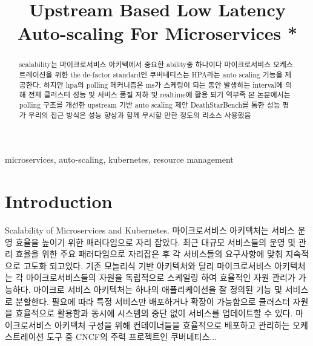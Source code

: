 \documentclass[conference]{IEEEtran}
\begin{document}
\title{Upstream Based Low Latency Auto-scaling For Microservices *\\}

\author{
}

\maketitle





\begin{abstract}

    scalability는 마이크로서비스 아키텍에서 중요한 ability중 하나이다
    마이크로서비스 오케스트레이션을 위한 the de-factor standard인 쿠버네티스는 HPA라는 auto scaling 기능을 제공한다. 하지만 hpa의 polling 메커니즘은 ms가 스케링이 되는 동안 발생하는 interval에 의해 전체 클러스터 성능 및 서비스 품질 저하 및 realtime에 활용 되기 역부족
    본 논문에서는 polling 구조를 개선한 upstream 기반 auto scaling 제안
    DeathStarBench를 통한 성능 평가
    우리의 접근 방식은 성능 향상과 함께 무시할 만한 정도의 리소스 사용했음

\end{abstract}




\begin{IEEEkeywords}
    microservices, auto-scaling, kubernetes, resource management
\end{IEEEkeywords}




\section{Introduction}
Scalability of Microservices and Kubernetes.
마이크로서비스 아키텍처는 서비스 운영 효율을 높이기 위한 패러다임으로 자리 잡았다. 최근 대규모 서비스들의 운영 및 관리 효율을 위한 주요 패러다임으로 자리잡은 후 각 서비스들의 요구사항에 맞춰 지속적으로 고도화 되고있다. 기존 모놀리식 기반 아키텍처와 달리 마이크로서비스 아키텍처는 각 마이크로서비스들의 자원을 독립적으로 스케일링 하여 효율적인 자원 관리가 가능하다. 마이크로 서비스 아키텍처는 하나의 애플리케이션을 잘 정의된 기능 및 서비스로 분할한다. 필요에 따라 특정 서비스만 배포하거나 확장이 가능함으로 클러스터 자원을 효율적으로 활용함과 동시에 시스템의 중단 없이 서비스를 업데이트할 수 있다. 마이크로서비스 아키텍처 구성을 위해 컨테이너들을 효율적으로 배포하고 관리하는 오케스트레이션 도구 중 CNCF의 주력 프로젝트인 쿠버네티스...
\end{document}
